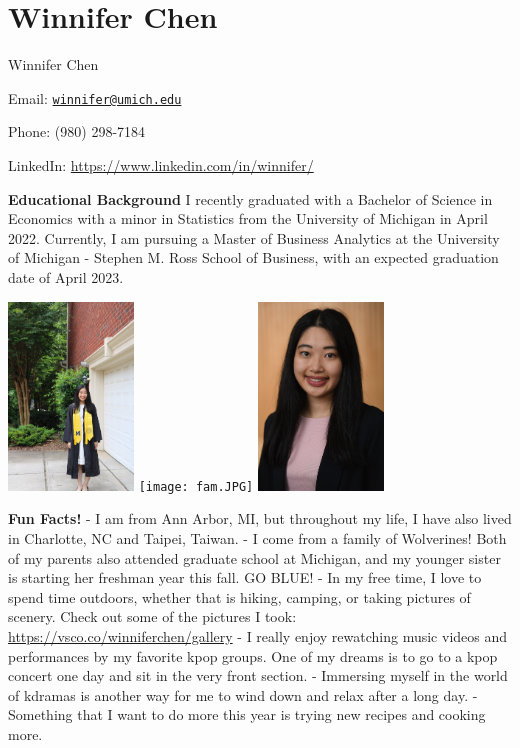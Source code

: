 \documentclass[
]{book}
\theoremstyle{definition}
\theoremstyle{definition}
\theoremstyle{definition}
\theoremstyle{definition}
\theoremstyle{remark}
\begin{document}
\hypertarget{winnifer-chen}{%
\section{Winnifer Chen}\label{winnifer-chen}}

Winnifer Chen

Email: \href{mailto:winnifer@umich.edu}{\nolinkurl{winnifer@umich.edu}}

Phone: (980) 298-7184

LinkedIn: \url{https://www.linkedin.com/in/winnifer/}

\textbf{Educational Background}
I recently graduated with a Bachelor of Science in Economics with a minor in Statistics from the University of Michigan in April 2022. Currently, I am pursuing a Master of Business Analytics at the University of Michigan - Stephen M. Ross School of Business, with an expected graduation date of April 2023.

\includegraphics[width=0.25\textwidth,height=\textheight]{grad.JPG}
\texttt{[image: fam.JPG]}
\includegraphics[width=0.25\textwidth,height=\textheight]{headshot.jpg}

\textbf{Fun Facts!}
- I am from Ann Arbor, MI, but throughout my life, I have also lived in Charlotte, NC and Taipei, Taiwan.
- I come from a family of Wolverines! Both of my parents also attended graduate school at Michigan, and my younger sister is starting her freshman year this fall. GO BLUE!
- In my free time, I love to spend time outdoors, whether that is hiking, camping, or taking pictures of scenery. Check out some of the pictures I took: \url{https://vsco.co/winniferchen/gallery}
- I really enjoy rewatching music videos and performances by my favorite kpop groups. One of my dreams is to go to a kpop concert one day and sit in the very front section.
- Immersing myself in the world of kdramas is another way for me to wind down and relax after a long day.
- Something that I want to do more this year is trying new recipes and cooking more.
\end{document}
